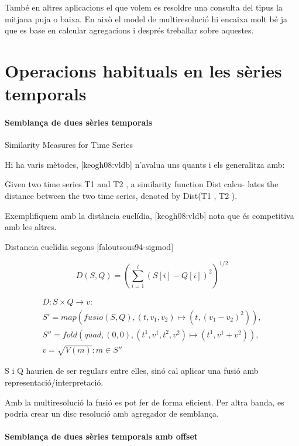 També en altres aplicacions el que volem es resoldre una consulta del tipus la mitjana puja o baixa. En això el model de multiresolució hi encaixa molt bé ja que es base en calcular agregacions i després treballar sobre aquestes. 









\section{Operacions habituals en les sèries temporals}


\paragraph{Semblança de dues sèries temporals}


Similarity Measures for Time Series

Hi ha varis mètodes, [keogh08:vldb] n'avalua uns quants i els generalitza amb:

Given two
time series T1 and T2 , a similarity function Dist calcu-
lates the distance between the two time series, denoted by
Dist(T1 , T2 ).

Exemplifiquem amb la distància euclídia, [keogh08:vldb] nota que és
competitiva amb les altres.

Distancia euclídia segons [faloutsous94-sigmod]


\[
D(S,Q) = \left( \sum_{i=1}^{l} (S[i]-Q[i])^2  \right)^{1/2}
\]

\begin{gather*}
  D: S \times Q \longrightarrow v: \\
  S' = map(fusio(S,Q),(t,v_1,v_2)\mapsto(t,(v_1-v_2)^2)), \\
  S'' = fold(quad,(0,0),(t^1,v^1,t^2,v^2)\mapsto(t^1,v^1+v^2)), \\
  v = \sqrt{V(m)}:m\in S''
\end{gather*}


S i Q haurien de ser regulars entre elles, sinó cal aplicar una fusió amb representació/interpretació.

Amb la multiresolució la fusió es pot fer de forma eficient. Per altra banda, es podria crear un disc resolució amb agregador de semblança.


\paragraph{Semblança de dues sèries temporals amb offset}

